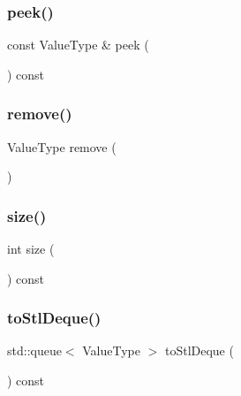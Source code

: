 \mbox{\label{classQueue_a74501ededf728c31068dd28a70a8a1f2}} 
\subsubsection{\texorpdfstring{peek()}{peek()}}
{\footnotesize\ttfamily const Value\+Type \& peek (\begin{DoxyParamCaption}{ }\end{DoxyParamCaption}) const}

\mbox{\label{classQueue_a025ec97fa5b04552f5ad0902c1f02ac1}} 
\subsubsection{\texorpdfstring{remove()}{remove()}}
{\footnotesize\ttfamily Value\+Type remove (\begin{DoxyParamCaption}{ }\end{DoxyParamCaption})}

\mbox{\label{classQueue_af9593d4a5ff4274efaf429cb4f9e57cc}} 
\subsubsection{\texorpdfstring{size()}{size()}}
{\footnotesize\ttfamily int size (\begin{DoxyParamCaption}{ }\end{DoxyParamCaption}) const}

\mbox{\label{classQueue_ac7bd339ad0d8fdd48a18540a5046e7de}} 
\subsubsection{\texorpdfstring{to\+Stl\+Deque()}{toStlDeque()}}
{\footnotesize\ttfamily std\+::queue$<$ Value\+Type $>$ to\+Stl\+Deque (\begin{DoxyParamCaption}{ }\end{DoxyParamCaption}) const}

\mbox{\label{classQueue_a81f999520c8e0cc10ab34041ad56fad2}} 
